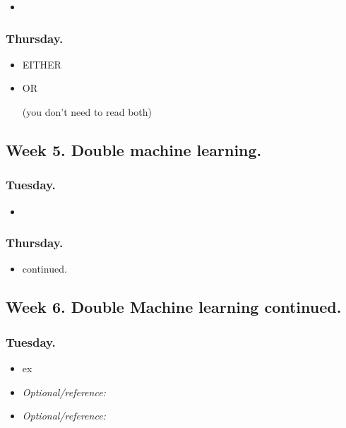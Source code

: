 \documentclass[letterpaper, 12pt, parskip=full,DIV=10]{scrartcl}
\begin{document}
\begin{itemize}
\item {}
\end{itemize}


\subsubsection*{Thursday.}

\begin{itemize}
\item EITHER\\ 
\item OR\\ 

(you don't need to read both)
\end{itemize}


\subsection*{Week 5. Double machine learning.}
\subsubsection*{Tuesday.}

\begin{itemize}
\item {}
\end{itemize}

\subsubsection*{Thursday.}
\begin{itemize}
\item \cite{kennedy2022semiparametric} continued. 
\end{itemize}

\subsection*{Week 6. Double Machine learning continued.}

\subsubsection*{Tuesday.}
\begin{itemize}
\item {} ex
\item  \textit{Optional/reference:} 
\item  \textit{Optional/reference:} 
\end{itemize}
\end{document}
